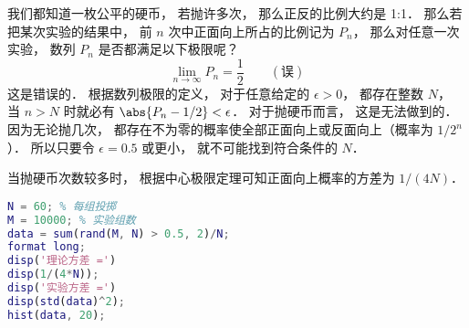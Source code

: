 
\begin{issues}
\issueDraft
\end{issues}


我们都知道一枚公平的硬币， 若抛许多次， 那么正反的比例大约是 1:1． 那么若把某次实验的结果中， 前 $n$ 次中正面向上所占的比例记为 $P_n$， 那么对任意一次实验， 数列 $P_n$ 是否都满足以下极限呢？
\begin{equation}
\lim_{n\to\infty} P_n = \frac{1}{2} \qquad (\text{误})
\end{equation}
这是错误的． 根据数列极限的定义， 对于任意给定的 $\epsilon > 0$， 都存在整数 $N$， 当 $n>N$ 时就必有 $\abs{P_n -1/2} < \epsilon$． 对于抛硬币而言， 这是无法做到的． 因为无论抛几次， 都存在不为零的概率使全部正面向上或反面向上（概率为 $1/2^n$）． 所以只要令 $\epsilon = 0.5$ 或更小， 就不可能找到符合条件的 $N$．

当抛硬币次数较多时， 根据中心极限定理可知正面向上概率的方差为 $1/(4N)$．

\begin{lstlisting}[language=matlab]
N = 60; % 每组投掷
M = 10000; % 实验组数
data = sum(rand(M, N) > 0.5, 2)/N;
format long;
disp('理论方差 =')
disp(1/(4*N));
disp('实验方差 =')
disp(std(data)^2);
hist(data, 20);
\end{lstlisting}

